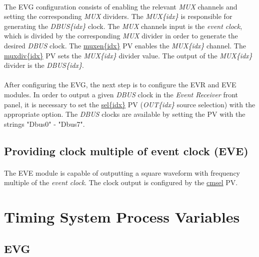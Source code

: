 \documentclass[openany]{article}
\begin{document}
		\paragraph{} The EVG configuration consists of enabling the relevant \emph{MUX} channels and setting the corresponding \emph{MUX} dividers. The \emph{MUX\{idx\}} is responsible for generating the \emph{DBUS\{idx\}} clock. The \emph{MUX} channels input is the \emph{event clock}, which is divided by the corresponding \emph{MUX} divider in order to generate the desired \emph{DBUS} clock. The \hyperref[pvgroup:evg-mux]{muxen\{idx\}} PV enables the \emph{MUX\{idx\}} channel. The \hyperref[pvgroup:evg-mux]{muxdiv\{idx\}} PV sets the \emph{MUX\{idx\}} divider value. The output of the \emph{MUX\{idx\}} divider is the \emph{DBUS\{idx\}}.
		\paragraph{} After configuring the EVG, the next step is to configure the EVR and EVE modules. In order to output a given \emph{DBUS} clock in the \emph{Event Receiver} front panel, it is necessary to set the \hyperref[pvgroup:evre-out]{sel\{idx\}} PV (\emph{OUT\{idx\}} source selection) with the appropriate option. The \emph{DBUS} clocks are available by setting the PV with the strings "Dbus0" - "Dbus7".

	\subsection{Providing clock multiple of event clock (EVE)}
		\paragraph{} The EVE module is capable of outputting a square waveform with frequency multiple of the \emph{event clock}. The clock output is configured by the \hyperref[pvgroup:eve-rf-output]{cmsel} PV.

\section{Timing System Process Variables}\label{sec:process-variables}

	\subsection{EVG}
\end{document}
